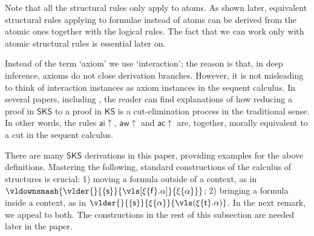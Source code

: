 \documentclass[a4paper]{LMCS}
\begin{document}
Note that all the structural rules only apply to atoms. As shown later, equivalent structural rules applying to formulae instead of atoms can be derived from the atomic ones together with the logical rules. The fact that we can work only with atomic structural rules is essential later on.

Instead of the term `axiom' we use `interaction'; the reason is that, in deep inference, axioms do not close derivation branches. However, it is not misleading to think of interaction instances as axiom instances in the sequent calculus. In several papers, including \cite{Brun:03:Atomic-C:oz}, the reader can find explanations of how reducing a proof in ${\mathsf{SKS}}$ to a proof in ${\mathsf{KS}}$ is a cut-elimination process in the traditional sense. In other words, the rules ${{{\mathsf{ai}}{\uparrow}}}$, ${{{\mathsf{aw}}{\uparrow}}}$ and ${{{\mathsf{ac}}{\uparrow}}}$ are, together, morally equivalent to a cut in the sequent calculus.

There are many ${\mathsf{SKS}}$ derivations in this paper, providing examples for the above definitions. Mastering the following, standard constructions of the calculus of structures is crucial: 1) moving a formula outside of a context, as in $\vldownsmash{\vlder{}{\{{\mathsf{s}}\}}{\vls[\xi\{{\mathsf f}\}.\alpha]}{\xi\{\alpha\}}}$; 2) bringing a formula inside a context, as in $\vlder{}{\{{\mathsf{s}}\}}{\xi\{\alpha\}}{\vls(\xi\{{\mathsf t}\}.\alpha)}$. In the next remark, we appeal to both. The constructions in the rest of this subsection are needed later in the paper.
\end{document}

